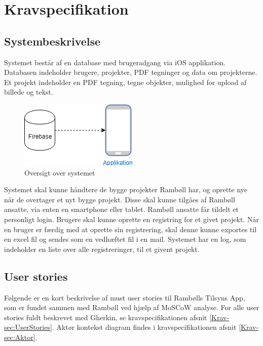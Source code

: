 	\chapter{Kravspecifikation}
	
			\section{Systembeskrivelse}
		Systemet består af en database med brugeradgang via iOS applikation.
		Databasen indeholder brugere, projekter, PDF tegninger og data om projekterne.
		Et projekt indeholder en PDF tegning, tegne objekter, mulighed for upload af billede og tekst.
		
		\begin{figure}[H]
			\centering
			\includegraphics[width=0.4\linewidth]{Kravspecifikation/Oversigtoversystem}
			\caption{Oversigt over systemet}
			\label{fig:OversigtSystembeskrivelse}
		\end{figure}
		
		Systemet skal kunne håndtere de bygge projekter Rambøll har, og oprette nye når de overtager et nyt bygge projekt.
		Disse skal kunne tilgåes af Rambøll ansatte, via enten en smartphone eller tablet.
		Rambøll ansatte får tildelt et personligt login.
		Brugere skal kunne oprette en registring for et givet projekt.
		Når en bruger er færdig med at oprette sin registrering, skal denne kunne exportes til en excel fil og sendes som en vedhæftet fil i en mail.
		Systemet har en log, som indeholder en liste over alle registreringer, til et givent projekt. \\	
				
		\clearpage

	
	\section{User stories} 
	Følgende er en kort beskrivelse af must user stories til Rambølls Tilsyns App, som er fundet sammen med Rambøll ved hjælp af MoSCoW analyse. \cite{MoSCoW} For alle user stories fuldt beskrevet med Gherkin, se kravspecifikationen afsnit \vref{Krav-sec:UserStories}.
	Aktør kontekst diagram findes i kravspecifikationen afsnit \vref{Krav-sec:Aktor}.

